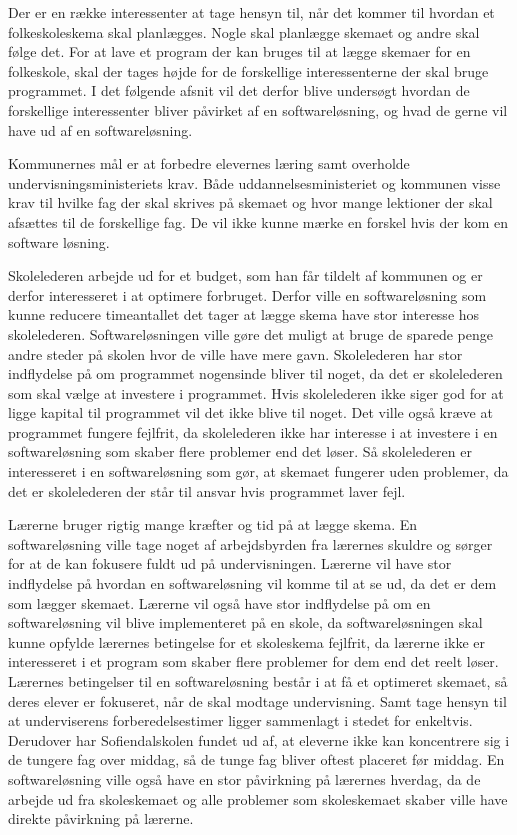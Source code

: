 Der er en række interessenter at tage hensyn til, når det kommer til hvordan et folkeskoleskema skal planlægges. Nogle skal planlægge skemaet og andre skal følge det. For at lave et program der kan bruges til at lægge skemaer for en folkeskole, skal der tages højde for de forskellige interessenterne der skal bruge programmet. I det følgende afsnit vil det derfor blive undersøgt hvordan de forskellige interessenter bliver påvirket af en softwareløsning, og hvad de gerne vil have ud af en softwareløsning. 


Kommunernes mål er at forbedre elevernes læring samt overholde undervisningsministeriets krav. Både uddannelsesministeriet og kommunen visse krav til hvilke fag der skal skrives på skemaet og hvor mange lektioner der skal afsættes til de forskellige fag. De vil ikke kunne mærke en forskel hvis der kom en software løsning.


Skolelederen arbejde ud for et budget, som han får tildelt af kommunen og er derfor interesseret i at optimere forbruget. Derfor ville en softwareløsning som kunne reducere timeantallet det tager at lægge skema have stor interesse hos skolelederen. Softwareløsningen ville gøre det muligt at bruge de sparede penge andre steder på skolen hvor de ville have mere gavn. Skolelederen har stor indflydelse på om programmet nogensinde bliver til noget, da det er skolelederen som skal vælge at investere i programmet. Hvis skolelederen ikke siger god for at ligge kapital til programmet vil det ikke blive til noget. Det ville også kræve at programmet fungere fejlfrit, da skolelederen ikke har interesse i at investere i en softwareløsning som skaber flere problemer end det løser. Så skolelederen er interesseret i en softwareløsning som gør, at skemaet fungerer uden problemer, da det er skolelederen der står til ansvar hvis programmet laver fejl.


Lærerne bruger rigtig mange kræfter og tid på at lægge skema. En softwareløsning ville tage noget af arbejdsbyrden fra lærernes skuldre og sørger for at de kan fokusere fuldt ud på undervisningen. Lærerne vil have stor indflydelse på hvordan en softwareløsning vil komme til at se ud, da det er dem som lægger skemaet. Lærerne vil også have stor indflydelse på om en softwareløsning vil blive implementeret på en skole, da softwareløsningen skal kunne opfylde lærernes betingelse for et skoleskema fejlfrit, da lærerne ikke er interesseret i et program som skaber flere problemer for dem end det reelt løser. Lærernes betingelser til en softwareløsning består i at få et optimeret skemaet, så deres elever er fokuseret, når de skal modtage undervisning. Samt tage hensyn til at underviserens forberedelsestimer ligger sammenlagt i stedet for enkeltvis. Derudover har Sofiendalskolen fundet ud af, at eleverne ikke kan koncentrere sig i de tungere fag over middag, så de tunge fag bliver oftest placeret før middag. En softwareløsning ville også have en stor påvirkning på lærernes hverdag, da de arbejde ud fra skoleskemaet og alle problemer som skoleskemaet skaber ville have direkte påvirkning på lærerne.


